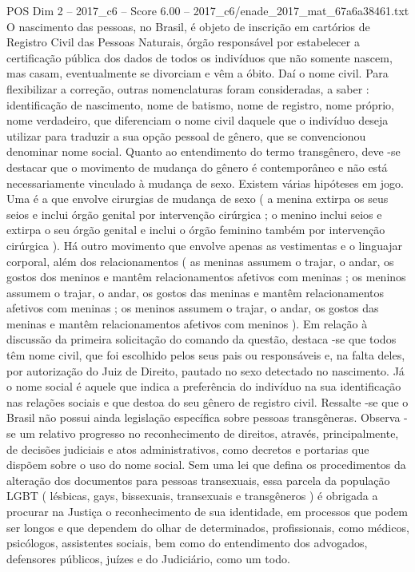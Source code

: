 \begin{textsample}{POS Dim 2 – 2017\_c6 – Score 6.00 – 2017\_c6/enade\_2017\_mat\_67a6a38461.txt}
O nascimento das pessoas, no Brasil, é objeto de inscrição em cartórios de Registro Civil das Pessoas Naturais, órgão responsável por estabelecer a certificação pública dos dados de todos os indivíduos que não somente nascem, mas casam, eventualmente se divorciam e vêm a óbito.
Daí o nome civil.
Para flexibilizar a correção, outras nomenclaturas foram consideradas, a saber : identificação de nascimento, nome de batismo, nome de registro, nome próprio, nome verdadeiro, que diferenciam o nome civil daquele que o indivíduo deseja utilizar para traduzir a sua opção pessoal de gênero, que se convencionou denominar nome social.
Quanto ao entendimento do termo transgênero, deve -se destacar que o movimento de mudança do gênero é contemporâneo e não está necessariamente vinculado à mudança de sexo.
Existem várias hipóteses em jogo.
Uma é a que envolve cirurgias de mudança de sexo ( a menina extirpa os seus seios e inclui órgão genital por intervenção cirúrgica ; o menino inclui seios e extirpa o seu órgão genital e inclui o órgão feminino também por intervenção cirúrgica ).
Há outro movimento que envolve apenas as vestimentas e o linguajar corporal, além dos relacionamentos ( as meninas assumem o trajar, o andar, os gostos dos meninos e mantêm relacionamentos afetivos com meninas ; os meninos assumem o trajar, o andar, os gostos das meninas e mantêm relacionamentos afetivos com meninas ; os meninos assumem o trajar, o andar, os gostos das meninas e mantêm relacionamentos afetivos com meninos ).
Em relação à discussão da primeira solicitação do comando da questão, destaca -se que todos têm nome civil, que foi escolhido pelos seus pais ou responsáveis e, na falta deles, por autorização do Juiz de Direito, pautado no sexo detectado no nascimento.
Já o nome social é aquele que indica a preferência do indivíduo na sua identificação nas relações sociais e que destoa do seu gênero de registro civil.
Ressalte -se que o Brasil não possui ainda legislação específica sobre pessoas transgêneras.
Observa -se um relativo progresso no reconhecimento de direitos, através, principalmente, de decisões judiciais e atos administrativos, como decretos e portarias que dispõem sobre o uso do nome social.
Sem uma lei que defina os procedimentos da alteração dos documentos para pessoas transexuais, essa parcela da população LGBT ( lésbicas, gays, bissexuais, transexuais e transgêneros ) é obrigada a procurar na Justiça o reconhecimento de sua identidade, em processos que podem ser longos e que dependem do olhar de determinados, profissionais, como médicos, psicólogos, assistentes sociais, bem como do entendimento dos advogados, defensores públicos, juízes e do Judiciário, como um todo.

\end{textsample}
